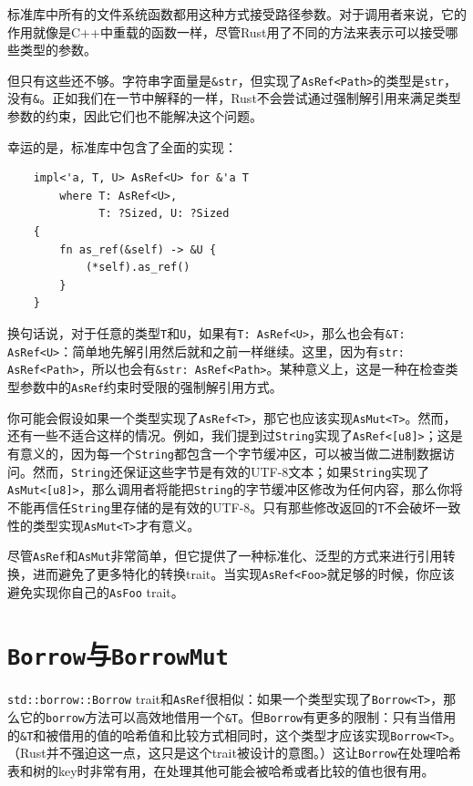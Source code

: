 标准库中所有的文件系统函数都用这种方式接受路径参数。对于调用者来说，它的作用就像是C++中重载的函数一样，尽管Rust用了不同的方法来表示可以接受哪些类型的参数。

但只有这些还不够。字符串字面量是\texttt{\&str}，但实现了\texttt{AsRef<Path>}的类型是\texttt{str}，没有\texttt{\&}。正如我们在一节中解释的一样，Rust不会尝试通过强制解引用来满足类型参数的约束，因此它们也不能解决这个问题。

幸运的是，标准库中包含了全面的实现：
\begin{verbatim}
    impl<'a, T, U> AsRef<U> for &'a T
        where T: AsRef<U>,
              T: ?Sized, U: ?Sized
    {
        fn as_ref(&self) -> &U {
            (*self).as_ref()
        }
    }
\end{verbatim}

换句话说，对于任意的类型\texttt{T}和\texttt{U}，如果有\texttt{T: AsRef<U>}，那么也会有\texttt{\&T: AsRef<U>}：简单地先解引用然后就和之前一样继续。这里，因为有\texttt{str: AsRef<Path>}，所以也会有\texttt{\&str: AsRef<Path>}。某种意义上，这是一种在检查类型参数中的\texttt{AsRef}约束时受限的强制解引用方式。

你可能会假设如果一个类型实现了\texttt{AsRef<T>}，那它也应该实现\texttt{AsMut<T>}。然而，还有一些不适合这样的情况。例如，我们提到过\texttt{String}实现了\texttt{AsRef<[u8]>}；这是有意义的，因为每一个\texttt{String}都包含一个字节缓冲区，可以被当做二进制数据访问。然而，\texttt{String}还保证这些字节是有效的UTF-8文本；如果\texttt{String}实现了\texttt{AsMut<[u8]>}，那么调用者将能把\texttt{String}的字节缓冲区修改为任何内容，那么你将不能再信任\texttt{String}里存储的是有效的UTF-8。只有那些修改返回的\texttt{T}不会破坏一致性的类型实现\texttt{AsMut<T>}才有意义。

尽管\texttt{AsRef}和\texttt{AsMut}非常简单，但它提供了一种标准化、泛型的方式来进行引用转换，进而避免了更多特化的转换trait。当实现\texttt{AsRef<Foo>}就足够的时候，你应该避免实现你自己的\texttt{AsFoo} trait。


\section{\texttt{Borrow}与\texttt{BorrowMut}}\label{borrow}

\texttt{std::borrow::Borrow} trait和\texttt{AsRef}很相似：如果一个类型实现了\texttt{Borrow<T>}，那么它的\texttt{borrow}方法可以高效地借用一个\texttt{\&T}。但\texttt{Borrow}有更多的限制：只有当借用的\texttt{\&T}和被借用的值的哈希值和比较方式相同时，这个类型才应该实现\texttt{Borrow<T>}。（Rust并不强迫这一点，这只是这个trait被设计的意图。）这让\texttt{Borrow}在处理哈希表和树的key时非常有用，在处理其他可能会被哈希或者比较的值也很有用。

